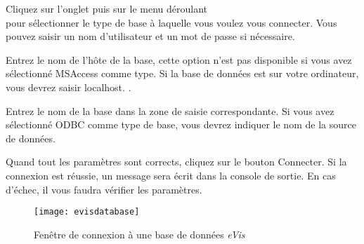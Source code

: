 \label{evis_connect_database}


Cliquez sur l'onglet  puis sur le menu déroulant\\  pour sélectionner le type de base à laquelle vous voulez vous connecter. Vous pouvez saisir un nom d'utilisateur et un mot de passe si nécessaire.


Entrez le nom de l'hôte de la base, cette option n'est pas disponible si vous avez sélectionné MSAccess  comme type. Si la base de données est sur votre ordinateur, vous devrez saisir localhost. .


Entrez le nom de la base dans la zone de saisie correspondante. Si vous avez sélectionné ODBC  comme type de base, vous devrez indiquer le nom de la source de données.


Quand tout les paramètres sont corrects, cliquez sur le bouton Connecter. Si la connexion est réussie, un message sera écrit dans la console de sortie. En cas d'échec, il vous faudra vérifier les paramètres.

\begin{figure}[ht]
   \begin{center}
\texttt{[image: evisdatabase]}
\caption{Fenêtre de connexion à une base de données \emph{eVis} \nixcaption}\label{evisdatabase}
\end{center}
\end{figure}

